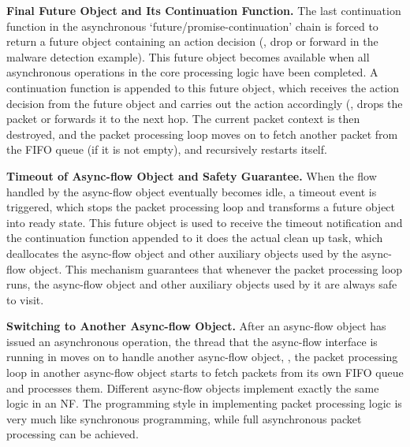 \vspace{1mm}
\noindent\textbf{Final Future Object and Its Continuation Function.} The last continuation function in the asynchronous `future/promise-continuation' chain is forced to return a future object containing an action decision (\eg, drop or forward in the malware detection example). This future object becomes available when all asynchronous operations in the core processing logic have been completed. A continuation function is appended to this future object, which receives the action decision from the future object and carries out the action accordingly (\eg, drops the packet or forwards it to the next hop. The current packet context is then destroyed, and the packet processing loop moves on to fetch another packet from the FIFO queue (if it is not empty), and recursively restarts itself.

\vspace{1mm}
\noindent\textbf{Timeout of Async-flow Object and Safety Guarantee.} When the flow handled by the async-flow object eventually becomes idle, a timeout event is triggered, which stops the packet processing loop and transforms a future object into ready state. This future object is used to receive the timeout notification and the continuation function appended to it does the actual clean up task, which deallocates the async-flow object and other auxiliary objects used by the async-flow object. This mechanism guarantees that whenever the packet processing loop runs, the async-flow object and other auxiliary objects used by it are always safe to visit.


\vspace{1mm}
\noindent\textbf{Switching to Another Async-flow Object.} After an async-flow object has issued an asynchronous operation, the thread that the async-flow interface is running in moves on to handle another async-flow object, \ie, the packet processing loop in another async-flow object starts to fetch packets from its own FIFO queue and processes them. Different async-flow objects implement exactly the same logic in an NF. The programming style in implementing packet processing logic is very much like synchronous programming, while full asynchronous packet processing can be achieved. %



